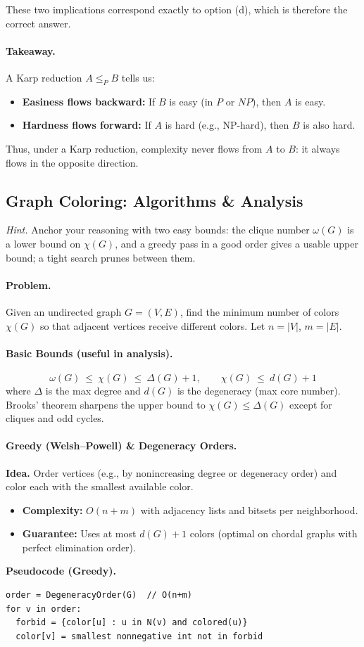 \documentclass[9pt]{extarticle}
\begin{document}
These two implications correspond exactly to option (d), which is therefore the
correct answer.

\paragraph{Takeaway.}
A Karp reduction \(A \le_P B\) tells us:
\begin{itemize}
    \item \textbf{Easiness flows backward:} If \(B\) is easy (in \(P\) or \(NP\)), then \(A\) is easy.
    \item \textbf{Hardness flows forward:} If \(A\) is hard (e.g., NP-hard), then \(B\) is also hard.
\end{itemize}
Thus, under a Karp reduction, complexity never flows from \(A\) to \(B\): it always
flows in the opposite direction.

\subsection*{Graph Coloring: Algorithms \& Analysis}
\textit{Hint.} Anchor your reasoning with two easy bounds: the clique number $\omega(G)$ is a lower bound on $\chi(G)$, and a greedy pass in a good order gives a usable upper bound; a tight search prunes between them.

\paragraph{Problem.}
Given an undirected graph $G=(V,E)$, find the minimum number of colors $\chi(G)$ so that adjacent vertices receive different colors. Let $n=|V|$, $m=|E|$.

\paragraph{Basic Bounds (useful in analysis).}
\[
\omega(G)\ \le\ \chi(G)\ \le\ \Delta(G)+1,\qquad
\chi(G)\ \le\ d(G)+1
\]
where $\Delta$ is the max degree and $d(G)$ is the degeneracy (max core number). Brooks’ theorem sharpens the upper bound to $\chi(G)\le \Delta(G)$ except for cliques and odd cycles.

\paragraph{Greedy (Welsh–Powell) \& Degeneracy Orders.}
\textbf{Idea.} Order vertices (e.g., by nonincreasing degree or degeneracy order) and color each with the smallest available color.
\begin{itemize}
  \item \textbf{Complexity:} $O(n+m)$ with adjacency lists and bitsets per neighborhood.
  \item \textbf{Guarantee:} Uses at most $d(G)+1$ colors (optimal on chordal graphs with perfect elimination order).
\end{itemize}
\textbf{Pseudocode (Greedy).}
\begin{verbatim}
order = DegeneracyOrder(G)  // O(n+m)
for v in order:
  forbid = {color[u] : u in N(v) and colored(u)}
  color[v] = smallest nonnegative int not in forbid
\end{verbatim}
\end{document}
